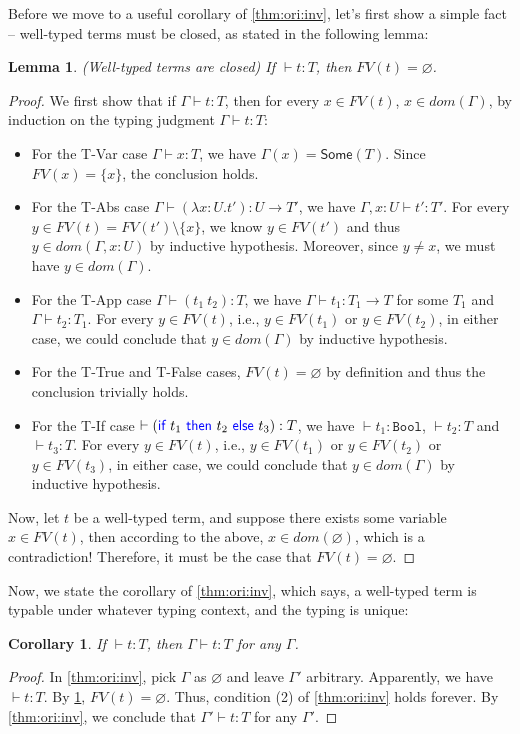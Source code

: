 \documentclass[11pt]{article}
\newtheorem{lemma}{Lemma}
\newtheorem{corollary}{Corollary}
\let\t\texttt
\let\emptyset\varnothing
\let\to\rightarrow
\newcommand{\Bool}{\t{Bool}}
\newcommand{\Some}[1]{\textsf{Some}(#1)}
\newcommand{\kword}[1]{{\color{blue} \textsf{#1}}}
\newcommand{\If}{\kword{if}}
\newcommand{\Then}{\kword{then}}
\newcommand{\Else}{\kword{else}}
\begin{document}
Before we move to a useful corollary of \cref{thm:ori:inv}, let's first show a simple fact -- well-typed terms must be closed, as stated in the following lemma:
\begin{lemma}\label{thm:ori:closed}
    (Well-typed terms are closed) If $\vdash t:T$, then $FV(t)=\emptyset$.
\end{lemma}
\begin{proof}
    We first show that if $\Gamma \vdash t:T$, then for every $x \in FV(t)$, $x \in dom(\Gamma)$,
    by induction on the typing judgment $\Gamma \vdash t:T$:
    \begin{itemize}
        \item For the T-Var case $\Gamma \vdash x:T$, we have $\Gamma(x)=\Some{T}$.
        Since $FV(x)=\{x\}$, the conclusion holds.
        \item For the T-Abs case $\Gamma \vdash (\lambda x:U.t'):U \to T'$, we have $\Gamma,x:U \vdash t':T'$.
        For every $y \in FV(t) = FV(t') \setminus \{x\}$, we know $y \in FV(t')$ and thus $y \in dom(\Gamma,x:U)$ by inductive hypothesis.
        Moreover, since $y \not=x$, we must have $y \in dom(\Gamma)$.
        \item For the T-App case $\Gamma \vdash (t_1~t_2):T$, we have $\Gamma \vdash t_1:T_1 \to T$ for some $T_1$ and $\Gamma \vdash t_2:T_1$.
        For every $y \in FV(t)$, i.e., $y \in FV(t_1)$ or $y \in FV(t_2)$, in either case, we could conclude that $y \in dom(\Gamma)$ by inductive hypothesis.
        \item For the T-True and T-False cases, $FV(t)=\emptyset$ by definition and thus the conclusion trivially holds.
        \item For the T-If case $\vdash (\If~t_1~\Then~t_2~\Else~t_3):T$, we have $\vdash t_1:\Bool$, $\vdash t_2:T$ and $\vdash t_3:T$.
        For every $y \in FV(t)$, i.e., $y \in FV(t_1)$ or $y \in FV(t_2)$ or $y \in FV(t_3)$, in either case, we could conclude that $y \in dom(\Gamma)$ by inductive hypothesis.
    \end{itemize}
    Now, let $t$ be a well-typed term, and suppose there exists some variable $x\in FV(t)$, then according to the above, $x \in dom(\emptyset)$, which is a contradiction!
    Therefore, it must be the case that $FV(t)=\emptyset$.
\end{proof}

Now, we state the corollary of \cref{thm:ori:inv}, which says, a well-typed term is typable under whatever typing context, and the typing is unique:
\begin{corollary}\label{thm:ori:inv-coro}
    If $\vdash t:T$, then $\Gamma \vdash t:T$ for any $\Gamma$.
\end{corollary}
\begin{proof}
    In \cref{thm:ori:inv}, pick $\Gamma$ as $\emptyset$ and leave $\Gamma'$ arbitrary.
    Apparently, we have $\vdash t:T$. By \cref{thm:ori:closed}, $FV(t)=\emptyset$.
    Thus, condition (2) of \cref{thm:ori:inv} holds forever.
    By \cref{thm:ori:inv}, we conclude that $\Gamma' \vdash t:T$ for any $\Gamma'$.
\end{proof}
\end{document}
